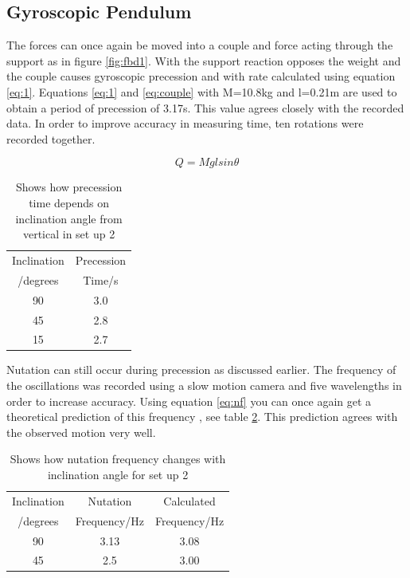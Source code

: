 \documentclass[twoside,twocolumn]{article}
\begin{document}
\subsection{Gyroscopic Pendulum}
The forces can once again be moved into a couple and force acting through the support as in figure \ref{fig:fbd1}. With the support reaction opposes the weight and the couple causes gyroscopic precession and with rate calculated using equation \ref{eq:1}. Equations \ref{eq:1} and \ref{eq:couple} with M=10.8kg and l=0.21m are used to obtain a period of precession of 3.17s. This value agrees closely with the recorded data. In order to improve accuracy in measuring time, ten rotations were recorded together.

\begin{equation}
\label{eq:couple}
Q=Mglsin\theta
\end{equation} 

\begin{table}[h]
\caption{Shows how precession time depends on inclination angle from vertical in set up 2}
\centering
\begin{tabular}{ c | c }
Inclination & Precession \\
/degrees & Time/s\\
\midrule
90 & 3.0   \\
45 & 2.8  \\
15 & 2.7  \\
\end{tabular}
\label{table:4}
\end{table}

Nutation can still occur during precession as discussed earlier. The frequency of the oscillations was recorded using a slow motion camera and five wavelengths in order to increase accuracy. Using equation \ref{eq:nf} you can once again get a theoretical prediction of this frequency , see table \ref{table:5}. This prediction agrees with the observed motion very well.

\begin{table}[h]
\caption{Shows how nutation frequency changes with inclination angle for set up 2}
\centering
\begin{tabular}{ c | c | c }
Inclination & Nutation &Calculated \\
/degrees & Frequency/Hz & Frequency/Hz\\
\midrule
90 & 3.13 & 3.08 \\
45 & 2.5 & 3.00\\
\end{tabular}
\label{table:5}
\end{table}
\end{document}
